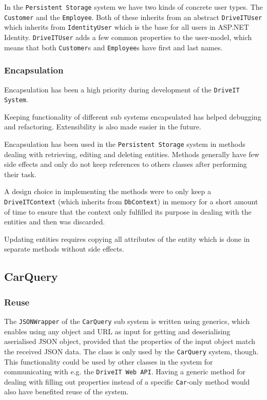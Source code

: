 In the \texttt{Persistent Storage} system we have two kinds of concrete user types. The \texttt{Customer} and the \texttt{Employee}. Both of these inherits from an abstract \texttt{DriveITUser} which inherits from \texttt{IdentityUser} which is the base for all users in ASP.NET Identity. \texttt{DriveITUser} adds a few common properties to the user-model, which means that both \texttt{Customer}s and \texttt{Employee}s have first and last names.

\subsubsection{Encapsulation}
Encapsulation has been a high priority during development of the \texttt{DriveIT System}. 

Keeping functionality of different sub systems encapsulated has helped debugging and refactoring. Extensibility is also made easier in the future.

Encapsulation has been used in the \texttt{Persistent Storage} system in methods dealing with retrieving, editing and deleting entities. Methods generally have few side effects and only do not keep references to others classes after performing their task.

A design choice in implementing the methods were to only keep a \texttt{DriveITContext} (which inherits from \texttt{DbContext}) in memory for a short amount of time to ensure that the context only fulfilled its purpose in dealing with the entities and then was discarded.

Updating entities requires copying all attributes of the entity which is done in separate methods without side effects.

\subsection{CarQuery}

\subsubsection{Reuse}
The \texttt{JSONWrapper} of the \texttt{CarQuery} sub system is written using generics, which enables using any object and URL as input for getting and deserialising aserialised JSON object, provided that the properties of the input object match the received JSON data. 
The class is only used by the \texttt{CarQuery} system, though. This functionality could be used by other classes in the system for communicating with e.g. the \texttt{DriveIT Web API}. 
Having a generic method for dealing with filling out properties instead of a specific \texttt{Car}-only method would also have benefited reuse of the system.

